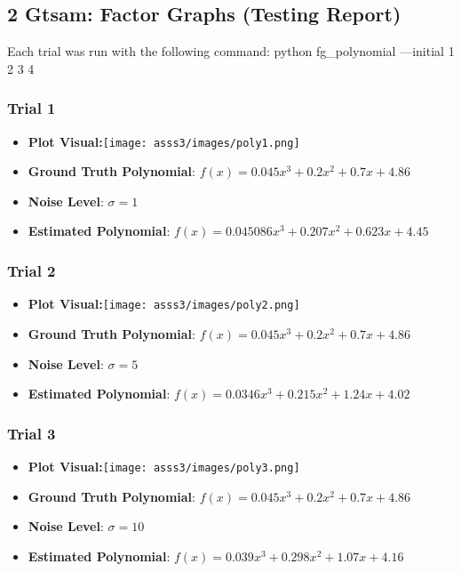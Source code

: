 \documentclass{article}
\begin{document}
\subsection*{2 Gtsam: Factor Graphs (Testing Report)}
Each trial was run with the following command:
python fg\_polynomial —initial 1 2 3 4

\subsubsection{Trial 1}
\begin{itemize}
    \item \textbf{Plot Visual:}\texttt{[image: asss3/images/poly1.png]}
    \item \textbf{Ground Truth Polynomial}: $f(x)=0.045x^3+0.2x^2+0.7x+4.86$
    \item \textbf{Noise Level}: $σ=1$
    \item \textbf{Estimated Polynomial}: $f(x)=0.045086x^3+0.207x^2+0.623x+4.45$
\end{itemize}

\subsubsection{Trial 2}
\begin{itemize}
    \item \textbf{Plot Visual:}\texttt{[image: asss3/images/poly2.png]}
    \item \textbf{Ground Truth Polynomial}: $f(x)=0.045x^3+0.2x^2+0.7x+4.86$
    \item \textbf{Noise Level}: $σ=5$
    \item \textbf{Estimated Polynomial}: $f(x)=0.0346x^3+0.215x^2+1.24x+4.02$
\end{itemize}

\subsubsection{Trial 3}
\begin{itemize}
    \item \textbf{Plot Visual:}\texttt{[image: asss3/images/poly3.png]}
    \item \textbf{Ground Truth Polynomial}: $f(x)=0.045x^3+0.2x^2+0.7x+4.86$
    \item \textbf{Noise Level}: $σ=10$
    \item \textbf{Estimated Polynomial}: $f(x)=0.039x^3+0.298x^2+1.07x+4.16$
\end{itemize}
\end{document}
